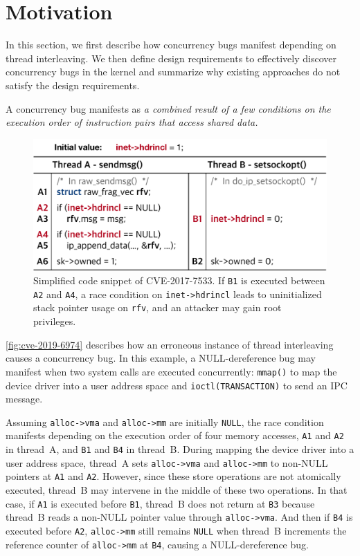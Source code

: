 \section{Motivation}
\label{s:motivation}

In this section, we first describe how concurrency bugs manifest
depending on thread interleaving.
%
We then define design requirements to effectively discover concurrency
bugs in the kernel and summarize why existing approaches do not
satisfy the design requirements.


%
A concurrency bug manifests as \textit{a combined result of a few
  conditions on the execution order of instruction pairs that access
  shared data.}


\begin{figure}[t]
  \centering
  \includegraphics[width=0.95\linewidth]{fig/cve-2017-10661.pdf}
  \caption{Simplified code snippet of CVE-2017-7533. If \texttt{B1} is
    executed between \texttt{A2} and \texttt{A4}, a race condition on
    \texttt{inet->hdrincl} leads to uninitialized stack pointer usage
    on \texttt{rfv}, and an attacker may gain root privileges.}
  \label{fig:cve-2019-6974}
\end{figure}

\autoref{fig:cve-2019-6974} describes how an erroneous instance of
thread interleaving causes a concurrency bug.
%
In this example, a NULL-dereference bug may manifest when two system
calls are executed concurrently: \texttt{mmap()} to map the device
driver into a user address space and \texttt{ioctl(TRANSACTION)} to
send an IPC message.


Assuming \texttt{alloc->vma} and \texttt{alloc->mm} are initially
\texttt{NULL}, the race condition manifests depending on the execution
order of four memory accesses, \texttt{A1} and \texttt{A2} in
thread~A, and \texttt{B1} and \texttt{B4} in thread~B.
%
During mapping the device driver into a user address space, thread~A
sets \texttt{alloc->vma} and \texttt{alloc->mm} to non-NULL pointers
at \texttt{A1} and \texttt{A2}.
%
However, since these store operations are not atomically executed,
thread~B may intervene in the middle of these two operations.
%
In that case, if \texttt{A1} is executed before \texttt{B1}, thread~B
does not return at \texttt{B3} because thread~B reads a non-NULL
pointer value through \texttt{alloc->vma}.
%
And then if \texttt{B4} is executed before \texttt{A2},
\texttt{alloc->mm} still remains \texttt{NULL} when thread~B
increments the reference counter of \texttt{alloc->mm} at \texttt{B4},
causing a NULL-dereference bug.



